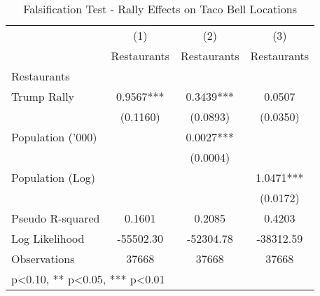 \begin{table}[htbp]\centering
\def\sym#1{\ifmmode^{#1}\else\(^{#1}\)\fi}
\caption{Falsification Test - Rally Effects on Taco Bell Locations}
\begin{tabular}{l*{3}{c}}
\hline\hline
                    &\multicolumn{1}{c}{(1)}   &\multicolumn{1}{c}{(2)}   &\multicolumn{1}{c}{(3)}   \\
                    & Restaurants   & Restaurants   & Restaurants   \\
\hline
Restaurants         &               &               &               \\
Trump Rally         &      0.9567***&      0.3439***&      0.0507   \\
                    &    (0.1160)   &    (0.0893)   &    (0.0350)   \\
Population ('000)   &               &      0.0027***&               \\
                    &               &    (0.0004)   &               \\
Population (Log)    &               &               &      1.0471***\\
                    &               &               &    (0.0172)   \\
\hline
Pseudo R-squared    &      0.1601   &      0.2085   &      0.4203   \\
Log Likelihood      &   -55502.30   &   -52304.78   &   -38312.59   \\
Observations        &       37668   &       37668   &       37668   \\
\hline\hline
\multicolumn{4}{l}{\footnotesize * p<0.10, ** p<0.05, *** p<0.01}\\
\end{tabular}
\end{table}
